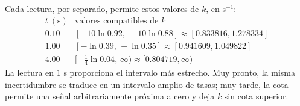 Cada lectura, por separado, permite estos valores de \(k\), en \(\mathrm s^{-1}\):
\[
\begin{array}{c|c}
t\ (\mathrm s)&\text{valores compatibles de }k\\\hline
0.10&[-10\ln0.92,\,-10\ln0.88]\approx[0.833816,1.278334]\\
1.00&[-\ln0.39,\,-\ln0.35]\approx[0.941609,1.049822]\\
4.00&[-\tfrac14\ln0.04,\,\infty)\approx[0.804719,\infty)
\end{array}
\]
La lectura en \(1\) s proporciona el intervalo más estrecho. Muy pronto, la misma incertidumbre se traduce en un intervalo amplio de tasas; muy tarde, la cota permite una señal arbitrariamente próxima a cero y deja \(k\) sin cota superior.
